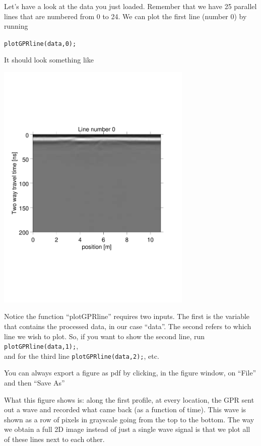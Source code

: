 \documentclass[11pt]{article}
\begin{document}
Let's have a look at the data you just loaded. Remember that we have
25 parallel lines that are numbered from 0 to 24. We can plot the
first line (number 0) by running

\qquad \verb#plotGPRline(data,0);#


It should look something like
\begin{center}
\includegraphics[width=0.7\textwidth, trim = 0.9cm 6cm 2cm
  6.5cm,clip]{figures/GPRline0}
\end{center}

Notice the function ``plotGPRline'' requires two inputs. The first
is the variable that contains the processed data, in our case ``data''.
The second refers to which line we wish to plot. So, if you want to show the second line, run \verb#plotGPRline(data,1);#,
\\and for the third line \verb#plotGPRline(data,2);#, etc.
 
You can always export a figure as pdf by clicking, in the figure
window, on ``File'' and then ``Save As''

What this figure shows is: along the first profile, at every location,
the GPR sent out a wave and recorded what came back (as a function of
time). This wave is shown as a row of pixels in grayscale going from
the top to the bottom. The way we obtain a full 2D image instead of
just a single wave signal is that we plot all of these lines next to
each other.
\end{document}
